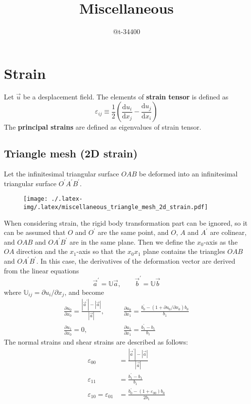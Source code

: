 \documentclass[]{article}
\title{Miscellaneous}
\author{@t-34400}
\theoremstyle{definition}
\newcommand{\dif}{\mathrm{d}}
\newcommand{\deriv}[2]{\frac{\dif #1}{\dif #2}}
\newcommand{\parderiv}[2]{\frac{\partial #1}{\partial #2}}
\begin{document}
\maketitle
\tableofcontents

\section{Strain}
Let $\vec{u}$ be a desplacement field. The elements of \textbf{strain tensor} is defined as
\begin{equation}
    \varepsilon_{ij}\equiv\frac{1}{2}\left(\deriv{u_i}{x_j} - \deriv{u_j}{x_i}\right)
\end{equation}
The \textbf{principal strains} are defined as eigenvalues of strain tensor.

\subsection{Triangle mesh (2D strain)}
Let the infinitesimal triangular surface $OAB$ be deformed into an infinitesimal triangular surface $O^\prime A^\prime B^\prime$. 
\begin{figure}[H]
    \centering
    \texttt{[image: ./.latex-img/.latex/miscellaneous\_triangle\_mesh\_2d\_strain.pdf]}
    \label{fig:infinitesimal_triangle_deformation_2d_strain}
\end{figure}
When considering strain, the rigid body transformation part can be ignored, so it can be assumed that $O$ and $O^\prime$ are the same point, and $O$, $A$ and $A^\prime$ are colinear, and $OAB$ and $O A^\prime B^\prime$ are in the same plane. 
Then we define the $x_0$-axis as the $OA$ direction and the $x_1$-axis so that the $x_0x_1$ plane contains the triangles $OAB$ and $OA^\prime B^\prime$.
In this case, the derivatives of the deformation vector are derived from the linear equations
\begin{equation}
    \vec{a}^\prime = \mathbb{U}\vec{a}, \qquad\vec{b}^\prime = \mathbb{U}\vec{b}
\end{equation}
where $\mathbb{U}_{ij} = \partial u_i/\partial x_j$, and become
\begin{equation}
    \begin{aligned}
        \parderiv{u_0}{x_0} = \frac{|\vec{a}^\prime|-|\vec{a}|}{|\vec{a}|},&\qquad\parderiv{u_0}{x_1} = \frac{b^\prime_0-(1 + \partial u_0/\partial x_0) b_0}{b_1}\\
        \parderiv{u_1}{x_0} = 0,&\qquad\parderiv{u_1}{x_1} = \frac{b^\prime_1 - b_1}{b_1}
    \end{aligned}
\end{equation}
The normal strains and shear strains are described as follows:
\begin{equation}
    \begin{aligned}
        \varepsilon_{00} &= \frac{|\vec{a}^\prime| - |\vec{a}|}{|\vec{a}|}\\
        \varepsilon_{11} &= \frac{b^\prime_1 - b_1}{b_1}\\
        \varepsilon_{10} = \varepsilon_{01} &= \frac{b^\prime_0 - (1+\varepsilon_{00})b_0}{2b_1}
    \end{aligned}
\end{equation}
\end{document}
